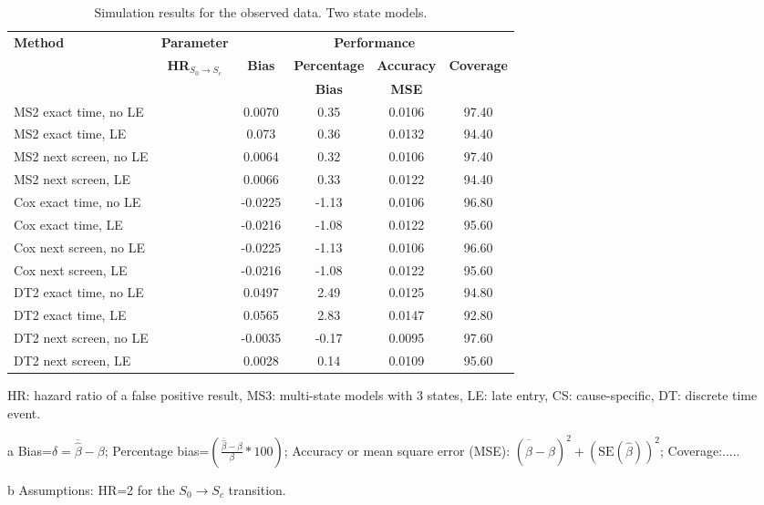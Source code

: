 \documentclass{bmcart}
\begin{document}
\begin{backmatter}
\begin{table}[!ht]
  \caption{Simulation results for the observed data. Two state models.}
  \begin{threeparttable}
    \begin{tabular}{l|c|c|c|c|c}
      \toprule
      \textbf{Method} & \textbf{Parameter} &\multicolumn{4}{c}{\textbf{Performance}\tnote{a,b}} \\ \cline{3-6}
      &   \textbf{HR$_{S_0 \rightarrow S_c}$} & \textbf{Bias} & \textbf{Percentage} & \textbf{Accuracy}  &  \textbf{Coverage}  \\
      & & & \textbf{Bias} &   \textbf{MSE}\\
      \midrule
      MS2 exact time, no LE&   & 0.0070&0.35&0.0106	&97.40\\
      \cmidrule{1-6}
      MS2 exact time, LE&  &0.073&	0.36&	0.0132&	94.40\\
      \cmidrule{1-6}
      MS2 next screen, no LE & & 0.0064&	0.32	&0.0106&97.40\\
      \cmidrule{1-6}
      MS2 next screen, LE&  &0.0066 &0.33 &0.0122&	94.40\\
      \midrule
      Cox exact time, no LE&  &-0.0225&	-1.13&	0.0106&	96.80\\
      \cmidrule{1-6}
      Cox exact time, LE&  & -0.0216&	-1.08&	0.0122&	95.60\\
      \cmidrule{1-6}
      Cox next screen, no LE&  &-0.0225&	-1.13&	0.0106&	96.60\\
      \cmidrule{1-6}
      Cox next screen, LE&  &-0.0216&	-1.08&	0.0122&	95.60\\
      \midrule
      DT2 exact time, no LE & &0.0497&	2.49&	0.0125	&94.80\\
      \cmidrule{1-6}
      DT2 exact time, LE&  &0.0565	&2.83 &	0.0147	&92.80\\
      \cmidrule{1-6}
      DT2 next screen, no LE&  &-0.0035 &-0.17 &0.0095 &97.60\\
      \cmidrule{1-6}
      DT2 next screen, LE& & 0.0028	&0.14	&0.0109	&95.60\\
      \bottomrule
    \end{tabular}
    \begin{tablenotes}\scriptsize
      \item HR: hazard ratio of a false positive result, MS3: multi-state models with 3 states, LE: late entry, CS: cause-specific, DT: discrete time event.
      \item[a] Bias=$\delta=\overline{\hat\beta}-\beta$; Percentage bias=$\left(\frac{\overline{\hat\beta}-\beta}{\beta}*100 \right)$; Accuracy or mean square error (MSE): $(\overline{\hat\beta}-\beta)^2+(\mbox{SE}(\hat \beta))^2$; 	 Coverage:..... 
      \item[b] Assumptions: HR=2 for the $S_0 \rightarrow S_c$ transition.
    \end{tablenotes}
  \end{threeparttable}
  \label{tab:HRFP_observed2}
\end{table}


\end{backmatter}
\end{document}
